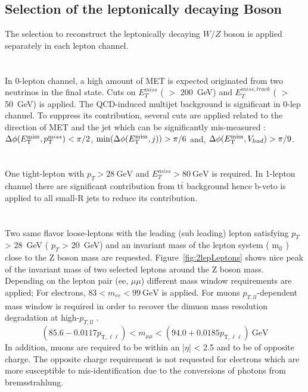 \subsection{Selection of the leptonically decaying Boson}
The selection to reconstruct the leptonically decaying $W/Z$ boson is applied separately in each lepton channel. \\ \\
\noindent\textbf{}  \\
In 0-lepton channel, a high amount of MET is expected originated from two neutrinos in the final state. Cuts on $E^{miss}_T$ ( $>$ 200~GeV) and $E^{miss,track}_T$ ( $>$ 50~GeV) is applied. The QCD-induced multijet background is significant in 0-lep channel. 
To suppress its contribution, several cuts are applied related to the direction of MET and the jet which can be significantly mis-measured : $\Delta\phi(E_\mathrm{T}^\mathrm{miss},p_{{\textrm T}}^{{\textrm miss}}) < \pi/2$, $\min(\Delta\phi(E_\mathrm{T}^\mathrm{miss},j)) > \pi/6$ and, $\Delta\phi(E_\mathrm{T}^\mathrm{miss}, V_{had}) > \pi/9$. \\ \\ 
\noindent\textbf{}  \\
One tight-lepton with $p_T > 28~\mathrm{GeV}$ and $E^{miss}_T > 80~\mathrm{GeV}$ is required. In 1-lepton channel there are significant contribution from t$\bar{\mathrm{t}}$ background hence b-veto is applied to all small-R jets to reduce its contribution.\\ \\
\noindent\textbf{}  \\
Two same flavor loose-leptons with the leading (sub leading) lepton satisfying $p_T$ > 28~GeV ( $p_T$ > 20~GeV) and an invariant mass of the lepton system ( m$_{ll}$ ) close to the Z boson mass are requested. Figure~\ref{fig:2lepLeptons} shows nice peak of the invariant mass of two selected leptons around the Z boson mass. Depending on the lepton pair (ee, $\mu\mu$) different mass
window requirements are applied; For electrons, $83<m_{ee}<99 ~\mathrm{GeV}$ is applied. For muons $p_{T,ll}$-dependent mass window is required in order to recover the dimuon mass resolution degradation at high-$p_{T,ll}$ \cite{EXOT-2016-29}.
\begin{equation*}
\left(85.6-0.0117 p_{\mathrm{T}, \ell \ell}\right)<m_{\mu \mu}<\left(94.0+0.0185 p_{\mathrm{T}, \ell \ell}\right) ~\mathrm{GeV}
\end{equation*}
In addition, muons are required to be within an |$\eta$| < 2.5 and to be of opposite charge. 
The opposite charge requirement is not requested for electrons which are more susceptible to mis-identification due to the conversions of photons from bremsstrahlung.

